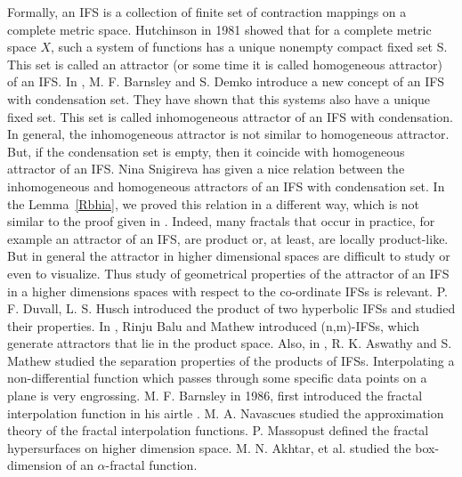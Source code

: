\documentclass[10pt]{amsart}
\theoremstyle{definition}
\begin{document}
	Formally, an IFS is a collection of finite set of contraction mappings on a complete metric space. Hutchinson \cite{AOIFS} in 1981 showed that for a complete metric space $X$, such a system of functions has a unique nonempty compact fixed set S. This set is called an attractor (or some time it is called homogeneous attractor) of an IFS. In \cite{ifsabcof}, M. F. Barnsley and S. Demko introduce a new concept of an IFS with condensation set. They have shown that this systems also have a unique fixed set. This set is called inhomogeneous attractor of an IFS with condensation. In general, the inhomogeneous attractor is not similar to homogeneous attractor. But, if the condensation set is empty, then it  coincide with homogeneous attractor of an IFS. Nina Snigireva \cite{Inssm} has given a nice relation between the inhomogeneous and homogeneous attractors of an IFS with condensation set. In the Lemma~\ref{Rbhia}, we proved this relation in a different way, which is not similar to the proof given in \cite{Inssm}. Indeed, many fractals that occur in practice, for example an attractor of an IFS, are product or, at least, are locally product-like. But in general the attractor in higher dimensional spaces are difficult to study or even to visualize. Thus study of geometrical properties of the attractor of an IFS in a higher dimensions spaces with respect to the co-ordinate IFSs is relevant. P. F. Duvall, L. S. Husch \cite{afifs} introduced the product of two hyperbolic IFSs and studied their properties. In \cite{onnmifs}, Rinju Balu and Mathew introduced (n,m)-IFSs, which generate attractors that lie in the product space. Also, in \cite{spoifs}, R. K. Aswathy and S. Mathew studied the separation properties of the products of IFSs. Interpolating a non-differential function which passes through some specific data points on a plane is very engrossing. M. F. Barnsley in 1986, first introduced the fractal interpolation function in his airtle \cite{Ftmapp}. M. A. Navascues \cite{ftaf,FSH,FFONS} studied the approximation theory of the fractal interpolation functions. P. Massopust \cite{fhsandawg} defined the fractal hypersurfaces on higher dimension space. M. N. Akhtar, et al. \cite{bdoaff,bdoaffwvsf} studied the box-dimension of an $\alpha$-fractal function.\\
	
\end{document}
